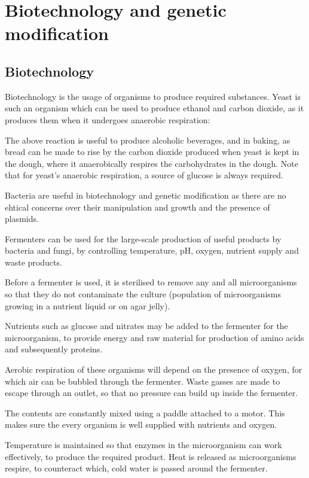 \section{Biotechnology and genetic modification}
\subsection{Biotechnology}

Biotechnology is the usage of organisms to produce required substances. Yeast is such an organism
which can be used to produce ethanol and carbon dioxide, as it produces them when it undergoes
anaerobic respiration:
\begin{center}
\end{center}
The above reaction is useful to produce alcoholic beverages, and in baking, as bread can be made
to rise by the carbon dioxide produced when yeast is kept in the dough, where it anaerobically
respires the carbohydrates in the dough. Note that for yeast's anaerobic respiration, a source
of glucose is always required.

Bacteria are useful in biotechnology and genetic modification as there are no ehtical concerns over
their manipulation and growth and the presence of plasmids.

Fermenters can be used for the large-scale production of useful products by bacteria and fungi,
by controlling temperature, pH, oxygen, nutrient supply and waste products.

Before a fermenter is used, it is sterilised to remove any and all microorganisms so that they do
not contaminate the culture (population of microorganisms growing in a nutrient liquid or on agar
jelly).

Nutrients such as glucose and nitrates may be added to the fermenter for the microorganism, to
provide energy and raw material for production of amino acids and subsequently proteins.

Aerobic respiration of these organisms will depend on the presence of oxygen, for which air can be
bubbled through the fermenter. Waste gasses are made to escape through an outlet, so that no 
pressure can build up inside the fermenter.

The contents are constantly mixed using a paddle attached to a motor. This makes sure the every
organism is well supplied with nutrients and oxygen.

Temperature is maintained so that enzymes in the microorganism can work effectively, to produce
the required product. Heat is released as microorganisms respire, to counteract which, cold water
is passed around the fermenter.

